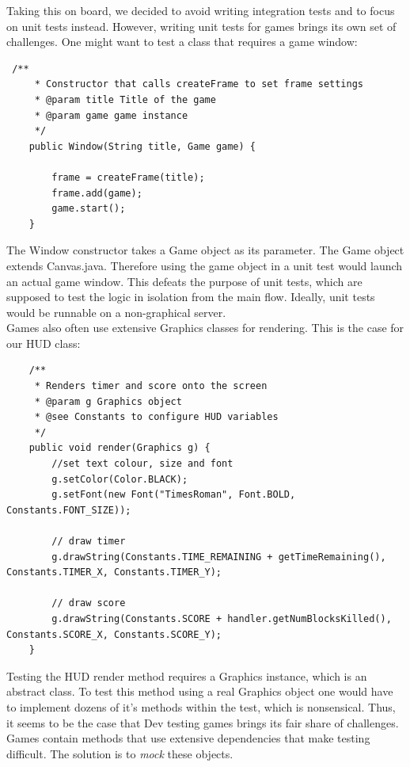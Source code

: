 \documentclass[12pt]{article}
\begin{document}
Taking this on board, we decided to avoid writing integration tests and to focus on unit tests instead. However, writing unit tests for games brings its own set of challenges. One might want to test a class that requires a game window:

\begin{verbatim}
 /**
     * Constructor that calls createFrame to set frame settings
     * @param title Title of the game
     * @param game game instance
     */
    public Window(String title, Game game) {

        frame = createFrame(title);
        frame.add(game);
        game.start();
    }
\end{verbatim}

The Window constructor takes a Game object as its parameter. The Game object extends Canvas.java. Therefore using the game object in a unit test would launch an actual game window. This defeats the purpose of unit tests, which are supposed to test the logic in isolation from the main flow. Ideally, unit tests would be runnable on a non-graphical server.\\

Games also often use extensive Graphics classes for rendering. This is the case for our HUD class:
\newpage

\begin{verbatim}
    /**
     * Renders timer and score onto the screen
     * @param g Graphics object
     * @see Constants to configure HUD variables
     */
    public void render(Graphics g) {
        //set text colour, size and font
        g.setColor(Color.BLACK);
        g.setFont(new Font("TimesRoman", Font.BOLD, Constants.FONT_SIZE));

        // draw timer
        g.drawString(Constants.TIME_REMAINING + getTimeRemaining(), Constants.TIMER_X, Constants.TIMER_Y);

        // draw score
        g.drawString(Constants.SCORE + handler.getNumBlocksKilled(), Constants.SCORE_X, Constants.SCORE_Y);
    }
\end{verbatim}

Testing the HUD render method requires a Graphics instance, which is an abstract class. To test this method using a real Graphics object one would have to implement dozens of it's methods within the test, which is nonsensical. Thus, it seems to be the case that Dev testing games brings its fair share of challenges. Games contain methods that use extensive dependencies that make testing difficult. The solution is to \emph{mock} these objects.
\end{document}
